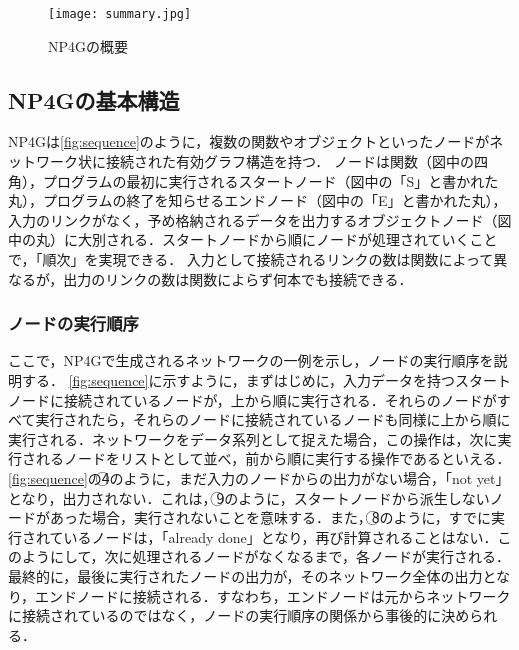 \documentclass[exploratorypaper]{jsaiart} %
\begin{document}
\begin{figure}[t]
    \begin{center}
        \texttt{[image: summary.jpg]}
    \end{center}
    \capwidth=90mm %
    \caption{NP4Gの概要}
    \label{fig:summary}
\end{figure}

\subsection{NP4Gの基本構造}
\label{sec:struct}
NP4Gは\ref{fig:sequence}のように，複数の関数やオブジェクトといったノードがネットワーク状に接続された有効グラフ構造を持つ．
ノードは関数（図中の四角），プログラムの最初に実行されるスタートノード（図中の「S」と書かれた丸），プログラムの終了を知らせるエンドノード（図中の「E」と書かれた丸），入力のリンクがなく，予め格納されるデータを出力するオブジェクトノード（図中の丸）に大別される．スタートノードから順にノードが処理されていくことで，「順次」を実現できる．
入力として接続されるリンクの数は関数によって異なるが，出力のリンクの数は関数によらず何本でも接続できる．
\subsubsection{ノードの実行順序}
\label{sec:sequence}
ここで，NP4Gで生成されるネットワークの一例を示し，ノードの実行順序を説明する．
\ref{fig:sequence}に示すように，まずはじめに，入力データを持つスタートノードに接続されているノードが，上から順に実行される．それらのノードがすべて実行されたら，それらのノードに接続されているノードも同様に上から順に実行される．ネットワークをデータ系列として捉えた場合，この操作は，次に実行されるノードをリストとして並べ，前から順に実行する操作であるといえる．
\ref{fig:sequence}の\textcircled{\scriptsize 4}のように，まだ入力のノードからの出力がない場合，「not yet」となり，出力されない．これは，\textcircled{\scriptsize 9}のように，スタートノードから派生しないノードがあった場合，実行されないことを意味する．また，\textcircled{\scriptsize 8}のように，すでに実行されているノードは，「already done」となり，再び計算されることはない．このようにして，次に処理されるノードがなくなるまで，各ノードが実行される．最終的に，最後に実行されたノードの出力が，そのネットワーク全体の出力となり，エンドノードに接続される．すなわち，エンドノードは元からネットワークに接続されているのではなく，ノードの実行順序の関係から事後的に決められる．
\end{document}
